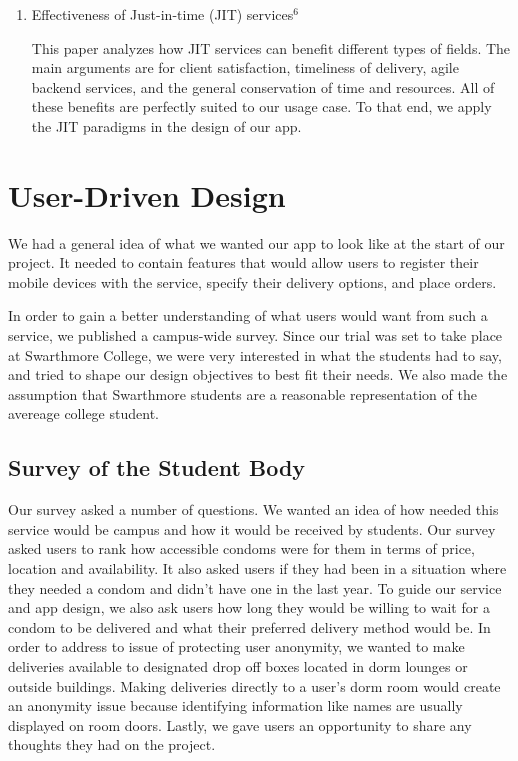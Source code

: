 \documentclass{acm_proc_article-sp}
\begin{document}
\begin{enumerate}
\item Effectiveness of Just-in-time (JIT) services$^6$

This paper analyzes how JIT services can benefit different types of fields. The main arguments are for client satisfaction, timeliness of delivery, agile backend services, and the general conservation of time and resources. All of these benefits are perfectly suited to our usage case. To that end, we apply the JIT paradigms in the design of our app.

\end{enumerate}

\section{User-Driven Design}
\smallskip
We had a general idea of what we wanted our app to look like at the start of our project. It needed to contain features that would allow users to register their mobile devices with the service, specify their delivery options, and place orders.

In order to gain a better understanding of what users would want from such a service, we published a campus-wide survey. Since our trial was set to take place at Swarthmore College, we were very interested in what the students had to say, and tried to shape our design objectives to best fit their needs. We also made the assumption that Swarthmore students are a reasonable representation of the avereage college student.

\subsection{Survey of the Student Body}
Our survey asked a number of questions. We wanted an idea of how needed this service would be campus and how it would be received by students. Our survey asked users to rank how accessible condoms were for them in terms of price, location and availability. It also asked users if they had been in a situation where they needed a condom and didn't have one in the last year. To guide our service and app design, we also ask users how long they would be willing to wait for a condom to be delivered and what their preferred delivery method would be. In order to address to issue of protecting user anonymity, we wanted to make deliveries available to designated drop off boxes located in dorm lounges or outside buildings. Making deliveries directly to a user's dorm room would create an anonymity issue because identifying information like names are usually displayed on room doors.  Lastly, we gave users an opportunity to share any thoughts they had on the project. 
\end{document}
